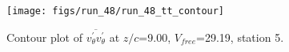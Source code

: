 \begin{figure}[H]
\centering
\texttt{[image: figs/run\_48/run\_48\_tt\_contour]}
\caption{Contour plot of $\overline{v_{\theta}^{\prime} v_{\theta}^{\prime}}$ at $z/c$=9.00, $V_{free}$=29.19, station 5.}
\label{fig:run_48_tt_contour}
\end{figure}


